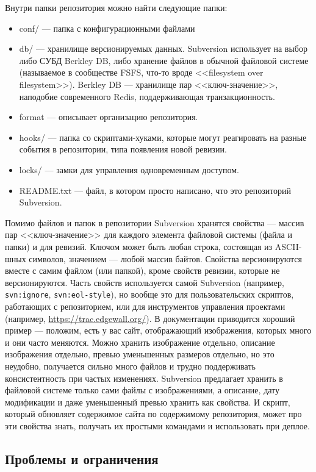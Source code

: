 \documentclass{../../text-style}
\begin{document}
Внутри папки репозитория можно найти следующие папки:
\begin{itemize}
    \item conf/ --- папка с конфигурационными файлами
    \item db/ --- хранилище версионируемых данных. Subversion использует на выбор либо СУБД Berkley DB, либо хранение файлов в обычной файловой системе (называемое в сообществе FSFS, что-то вроде <<filesystem over filesystem>>). Berkley DB --- хранилище пар <<ключ-значение>>, наподобие современного Redis, поддерживающая транзакционность.
    \item format --- описывает организацию репозитория.
    \item hooks/ --- папка со скриптами-хуками, которые могут реагировать на разные события в репозитории, типа появления новой ревизии.
    \item locks/ --- замки для управления одновременным доступом.
    \item README.txt --- файл, в котором просто написано, что это репозиторий Subversion.
\end{itemize}

Помимо файлов и папок в репозитории Subversion хранятся свойства --- массив пар <<ключ-значение>> для каждого элемента файловой системы (файла и папки) и для ревизий. Ключом может быть любая строка, состоящая из ASCII-шных символов, значением --- любой массив байтов. Свойства версионируются вместе с самим файлом (или папкой), кроме свойств ревизии, которые не версионируются. Часть свойств используется самой Subversion (например, \verb|svn:ignore|, \verb|svn:eol-style|), но вообще это для пользовательских скриптов, работающих с репозиторием, или для инструментов управления проектами (например, \url{https://trac.edgewall.org/}). В документации приводится хороший пример --- положим, есть у вас сайт, отображающий изображения, которых много и они часто меняются. Можно хранить изображение отдельно, описание изображения отдельно, превью уменьшенных размеров отдельно, но это неудобно, получается сильно много файлов и трудно поддерживать консистентность при частых изменениях. Subversion предлагает хранить в файловой системе только сами файлы с изображениями, а описание, дату модификации и даже уменьшенный превью хранить как свойства. И скрипт, который обновляет содержимое сайта по содержимому репозитория, может про эти свойства знать, получать их простыми командами и использовать при деплое.

\subsection{Проблемы и ограничения}
\end{document}
